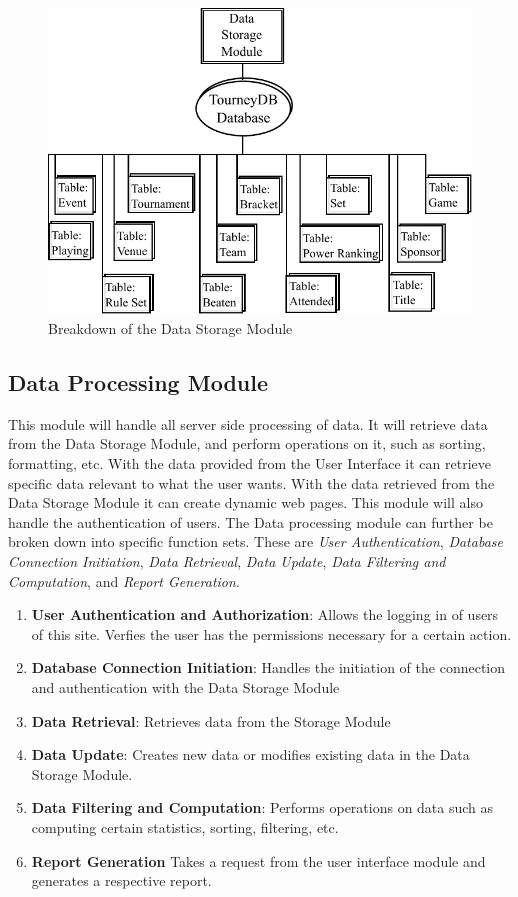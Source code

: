 \documentclass{article}
\begin{document}
\begin{figure}[H]
      \centering
      \includegraphics[width=.8\linewidth]{Figures/DataStorageModule.pdf}
      \caption{Breakdown of the Data Storage Module}
      \label{fig:datastoragemodule}
\end{figure}

\subsection{Data Processing Module}

This module will handle all server side processing of data. It will retrieve data from the Data Storage Module, and perform operations on it, such as sorting, formatting, etc. With the data provided from the User Interface it can retrieve specific data relevant to what the user wants. With the data retrieved from the Data Storage Module it can create dynamic web pages. This module will also handle the authentication of users. The Data processing module can further be broken down into specific function sets. These are \emph{User Authentication},  \emph{Database Connection Initiation}, \emph{Data Retrieval}, \emph{Data Update}, \emph{Data Filtering and Computation}, and \emph{Report Generation}.

\begin{enumerate}[noitemsep]
    \item \textbf{User Authentication and Authorization}: Allows the logging in of users of this site. Verfies the user has the permissions necessary for a certain action.
    \item \textbf{Database Connection Initiation}: Handles the initiation of the connection and authentication with the Data Storage Module
    \item \textbf{Data Retrieval}: Retrieves data from the Storage Module
    \item \textbf{Data Update}: Creates new data or modifies existing data in the Data Storage Module.
    \item \textbf{Data Filtering and Computation}: Performs operations on data such as computing certain statistics, sorting, filtering, etc.
    \item \textbf{Report Generation} Takes a request from the user interface module and generates a respective report.
\end{enumerate}
\end{document}
